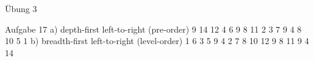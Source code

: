 Übung 3

Aufgabe 17
a) depth-first left-to-right (pre-order)
9 14 12 4 6 9 8 11 2 3 7 9 4 8 10 5 1
b) breadth-first left-to-right (level-order)
1 6 3 5 9 4 2 7 8 10 12 9 8 11 9 4 14